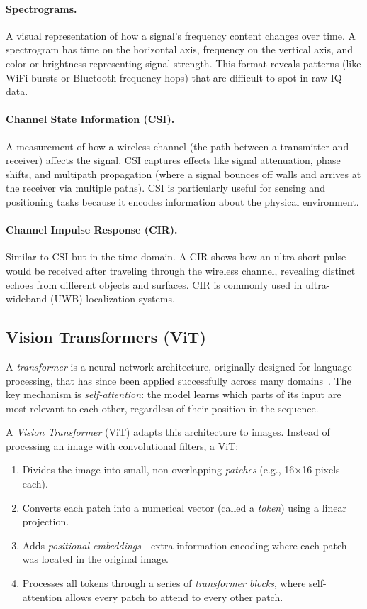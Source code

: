\documentclass[11pt]{article}
\begin{document}
\paragraph{Spectrograms.} A visual representation of how a signal's frequency content changes over time. A spectrogram has time on the horizontal axis, frequency on the vertical axis, and color or brightness representing signal strength. This format reveals patterns (like WiFi bursts or Bluetooth frequency hops) that are difficult to spot in raw IQ data.

\paragraph{Channel State Information (CSI).} A measurement of how a wireless channel (the path between a transmitter and receiver) affects the signal. CSI captures effects like signal attenuation, phase shifts, and multipath propagation (where a signal bounces off walls and arrives at the receiver via multiple paths). CSI is particularly useful for sensing and positioning tasks because it encodes information about the physical environment.

\paragraph{Channel Impulse Response (CIR).} Similar to CSI but in the time domain. A CIR shows how an ultra-short pulse would be received after traveling through the wireless channel, revealing distinct echoes from different objects and surfaces. CIR is commonly used in ultra-wideband (UWB) localization systems.

\subsection{Vision Transformers (ViT)}

A \textit{transformer} is a neural network architecture, originally designed for language processing, that has since been applied successfully across many domains~\cite{dosovitskiy2021vit}. The key mechanism is \textit{self-attention}: the model learns which parts of its input are most relevant to each other, regardless of their position in the sequence.

A \textit{Vision Transformer} (ViT) adapts this architecture to images. Instead of processing an image with convolutional filters, a ViT:
\begin{enumerate}
    \item Divides the image into small, non-overlapping \textit{patches} (e.g., 16$\times$16 pixels each).
    \item Converts each patch into a numerical vector (called a \textit{token}) using a linear projection.
    \item Adds \textit{positional embeddings}---extra information encoding where each patch was located in the original image.
    \item Processes all tokens through a series of \textit{transformer blocks}, where self-attention allows every patch to attend to every other patch.
\end{enumerate}
\end{document}
